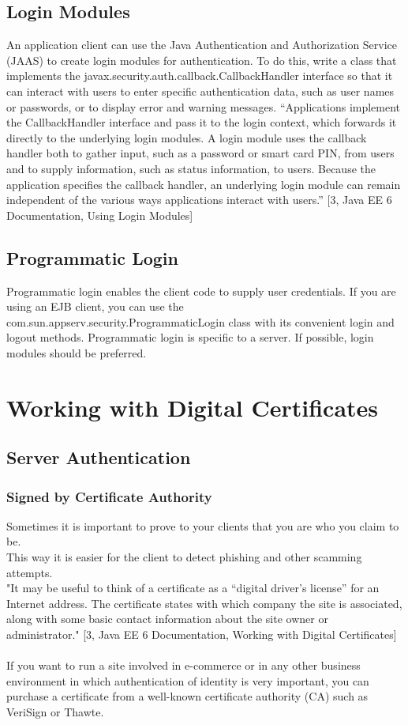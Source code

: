 \documentclass[12pt,a4paper]{report}
\begin{document}
\section{Login Modules}
An application client can use the Java Authentication and Authorization Service (JAAS) to create login modules for authentication.
To do this, write a class that implements the javax.security.auth.callback.CallbackHandler interface so that it can interact with users to enter specific authentication data, such as user names or passwords, or to display error and warning messages.
“Applications implement the CallbackHandler interface and pass it to the login context, which forwards it directly to the underlying login modules. A login module uses the callback handler both to gather input, such as a password or smart card PIN, from users and to supply information, such as status information, to users. Because the application specifies the callback handler, an underlying login module can remain independent of the various ways applications interact with users.” [3, Java EE 6 Documentation, Using Login Modules]

\section{Programmatic Login}
Programmatic login enables the client code to supply user credentials. If you are using an EJB client, you can use the com.sun.appserv.security.ProgrammaticLogin class with its convenient login and logout methods. Programmatic login is specific to a server. If possible, login modules should be preferred. 


\chapter{Working with Digital Certificates}
\section{Server Authentication}
\subsection{Signed by Certificate Authority}
Sometimes it is important to prove to your clients that you are who you claim to be.\\
This way it is easier for the client to detect phishing and other scamming attempts.\\

"It may be useful to think of a certificate as a “digital driver’s license” for an Internet address. The certificate states with which company the site is associated, along with some basic contact information about the site owner or administrator." [3, Java EE 6 Documentation, Working with Digital Certificates]\\\\
If you want to run a site involved in e-commerce or in any other business environment in which authentication of identity is very important, you can purchase a certificate from a well-known certificate authority (CA) such as VeriSign or Thawte.
\end{document}
